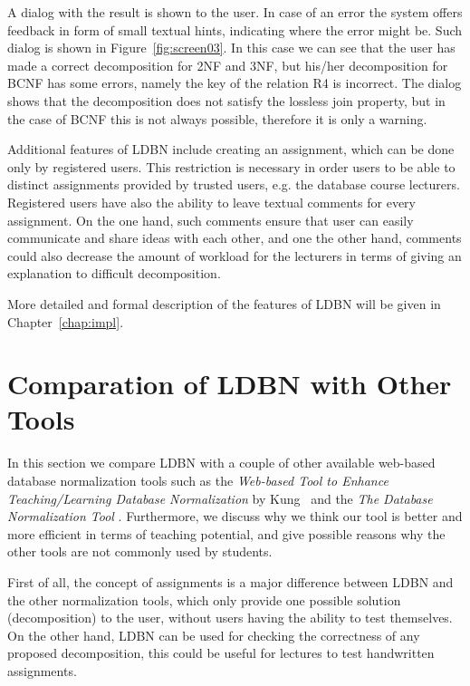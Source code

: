 A dialog with the result is shown to the user. In case of an error the system offers
feedback in form of small textual hints, indicating
where the error might be. Such dialog is shown in Figure~\ref{fig:screen03}. In this case
we can see that the user has made a correct decomposition for 2NF and 3NF,
but his/her decomposition for BCNF has some errors, namely the key of the relation R4 is
incorrect. The dialog shows that the decomposition does not 
satisfy the lossless join property, but in the case of BCNF this
is not always possible, therefore it is only a warning. 

Additional features of LDBN include creating an assignment, which can be done 
only by registered users. This restriction is necessary in order users to be able 
to distinct assignments provided by trusted users, e.g. the database course
lecturers. Registered users have also the ability to leave textual comments 
for every assignment. On the one hand, such
comments ensure that user can easily communicate and share ideas
with each other, and one the other hand, comments could also decrease the amount of workload
for the lecturers in terms of giving an explanation to difficult decomposition.

More detailed and formal description of the features of LDBN will be given in
Chapter~\ref{chap:impl}. 

\section{Comparation of LDBN with Other Tools}
\label{sec:comparation}
In this section we compare LDBN with a couple of other 
available web-based database normalization tools 
such as the \textit{Web-based Tool to Enhance Teaching/Learning Database 
Normalization} by Kung~\cite{p8} and the \textit{The Database Normalization Tool}
\cite{w1}. Furthermore, we discuss why we think our tool is better 
and more efficient
in terms of teaching potential, and give possible reasons why the 
other tools are not commonly used by students.

First of all, the concept of assignments is a major
difference between LDBN and the other normalization tools, 
which only provide 
one possible solution (decomposition) to the user, without users having the ability to test 
themselves. On the other hand, LDBN can be used for checking the correctness of any
proposed decomposition, this could be useful for lectures to test handwritten assignments. 

